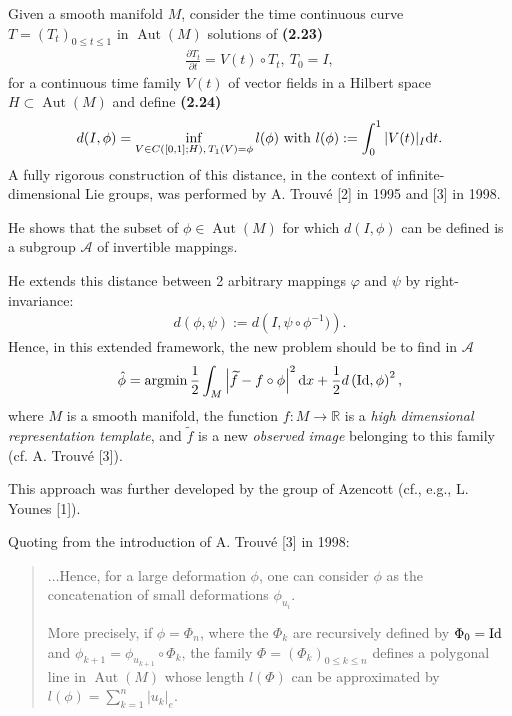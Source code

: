 \documentclass{book}
\numberwithin{equation}{section}
\begin{document}
\begin{enumerate}
    Given a smooth manifold $M$, consider the time continuous curve $T = (T_t)_{0\le t\le 1}$ in $\operatorname{Aut}(M)$ solutions of \textbf{(2.23)}
    \begin{align*}
        \frac{\partial T_t}{\partial t} = V(t)\circ T_t,\ T_0 = I,
    \end{align*}
    for a continuous time family $V(t)$ of vector fields in a Hilbert space $H\subset\operatorname{Aut}(M)$ and define \textbf{(2.24)}
    \begin{align*}
        d(I,\phi) = \inf_{V\in C([0,1];H),\,T_1(V) = \phi} l(\phi) \mbox{ with } l(\phi) := \int_0^1 |V(t)|_I{\rm d}t.
    \end{align*}
    A fully rigorous construction of this distance, in the context of infinite-dimensional Lie groups, was performed by A. Trouvé [2] in 1995 and [3] in 1998.
    
    He shows that the subset of $\phi\in\operatorname{Aut}(M)$ for which $d(I,\phi)$ can be defined is a subgroup $\mathcal{A}$ of invertible mappings.
    
    He extends this distance between 2 arbitrary mappings $\varphi$ and $\psi$ by right-invariance:
    \begin{align*}
        d(\phi,\psi) := d\left(I,\psi\circ\phi^{-1})\right).
    \end{align*}
    Hence, in this extended framework, the new problem should be to find in $\mathcal{A}$
    \begin{align*}
        \hat{\phi} = \operatorname{argmin}\frac{1}{2}\int_M \left|\widetilde{f} - f\circ\phi\right|^2{\rm d}x + \frac{1}{2}d\left({\rm Id},\phi\right)^2,
    \end{align*}
    where $M$ is a smooth manifold, the function $f:M\to\mathbb{R}$ is a \textit{high dimensional representation template}, and $\widetilde{f}$ is a new \textit{observed image} belonging to this family (cf. A. Trouvé [3]).
    
    This approach was further developed by the group of Azencott (cf., e.g., L. Younes [1]).
    
    Quoting from the introduction of A. Trouvé [3] in 1998:
    \begin{quotation}
        $\ldots$Hence, for a large deformation $\phi$, one can consider $\phi$ as the concatenation of small deformations $\phi_{u_i}$.
        
        More precisely, if $\phi = \Phi_n$, where the $\Phi_k$ are recursively defined by $\Phi_0 = {\rm Id}$ and $\phi_{k+1} = \phi_{u_{k+1}}\circ\Phi_k$, the family $\Phi = \left(\Phi_k\right)_{0\le k\le n}$ defines a polygonal line in $\operatorname{Aut}(M)$ whose length $l(\Phi)$ can be approximated by $l(\phi) = \sum_{k=1}^n |u_k|_e$.
        

\end{quotation}
\end{enumerate}
\end{document}
